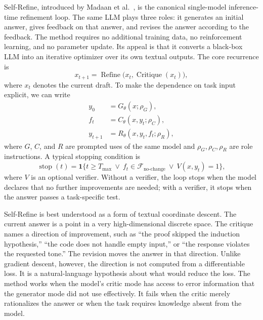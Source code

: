 Self-Refine, introduced by Madaan et al.\ \cite{madaan2023selfrefine}, is the canonical single-model inference-time refinement loop. The same LLM plays three roles: it generates an initial answer, gives feedback on that answer, and revises the answer according to the feedback. The method requires no additional training data, no reinforcement learning, and no parameter update. Its appeal is that it converts a black-box LLM into an iterative optimizer over its own textual outputs. The core recurrence is
\begin{equation}
    x_{t+1}=\operatorname{Refine}\bigl(x_t,\operatorname{Critique}(x_t)\bigr),
    \label{eq:self-refine-user-formula}
\end{equation}
where $x_t$ denotes the current draft. To make the dependence on task input explicit, we can write
\begin{align}
    y_0 &= G_\theta(x;\rho_G), \\
    f_t &= C_\theta(x,y_t;\rho_C), \\
    y_{t+1} &= R_\theta(x,y_t,f_t;\rho_R),
    \label{eq:self-refine-formal}
\end{align}
where $G$, $C$, and $R$ are prompted uses of the same model and $\rho_G,\rho_C,\rho_R$ are role instructions. A typical stopping condition is
\begin{equation}
    \operatorname{stop}(t)=\mathbf{1}\{t\geq T_{\max}\ \lor\ f_t\in\mathcal{F}_{\mathrm{no\text{-}change}}\ \lor\ V(x,y_t)=1\},
\end{equation}
where $V$ is an optional verifier. Without a verifier, the loop stops when the model declares that no further improvements are needed; with a verifier, it stops when the answer passes a task-specific test.

Self-Refine is best understood as a form of textual coordinate descent. The current answer is a point in a very high-dimensional discrete space. The critique names a direction of improvement, such as ``the proof skipped the induction hypothesis,'' ``the code does not handle empty input,'' or ``the response violates the requested tone.'' The revision moves the answer in that direction. Unlike gradient descent, however, the direction is not computed from a differentiable loss. It is a natural-language hypothesis about what would reduce the loss. The method works when the model's critic mode has access to error information that the generator mode did not use effectively. It fails when the critic merely rationalizes the answer or when the task requires knowledge absent from the model.

